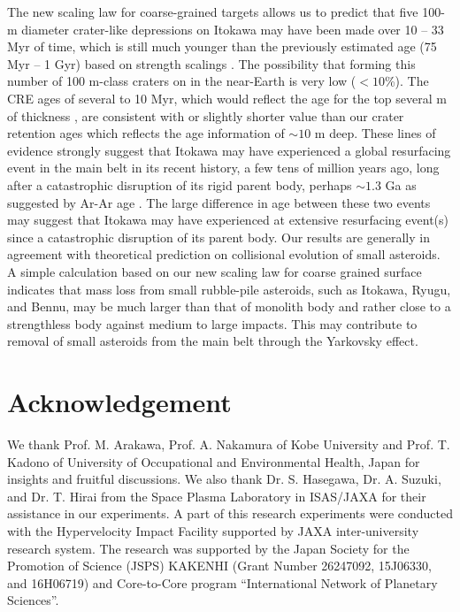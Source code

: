 \documentclass[3p,authoryear]{elsarticle}
\begin{document}
The new scaling law for coarse-grained targets allows us to predict that five 100-m diameter crater-like depressions on Itokawa may have been made over 10 -- 33 Myr of time, which is still much younger than the previously estimated age (75 Myr -- 1 Gyr) based on strength scalings \citep{michel2009}.
The possibility that forming this number of 100 m-class craters on in the near-Earth is very low ($<10$\%).
The CRE ages of several to 10 Myr, which would reflect the age for the top several m of thickness \citep{nagao2011, meier2014, nishiizumi2015}, are consistent with or slightly shorter value than  our crater retention ages which reflects the age information of $\sim 10$ m deep.
These lines of evidence strongly suggest that Itokawa may have experienced a global resurfacing event in the main belt in its recent history, a few tens of million years ago, long after a catastrophic disruption of its rigid parent body, perhaps $\sim 1.3$ Ga as suggested by Ar-Ar age \citep{park2015}.
The large difference in age between these two events may suggest that Itokawa may have experienced at extensive resurfacing event(s) since a catastrophic disruption of its parent body.
Our results are generally in agreement with theoretical prediction on collisional evolution of small asteroids.
A simple calculation based on our new scaling law for coarse grained surface indicates that mass loss from small rubble-pile asteroids, such as Itokawa, Ryugu, and Bennu, may be much larger than that of monolith body and rather close to a strengthless body against medium to large impacts.
This may contribute to removal of small asteroids from the main belt through the Yarkovsky effect.

\section*{Acknowledgement}
We thank Prof. M. Arakawa, Prof. A. Nakamura of Kobe University and Prof. T. Kadono of University of Occupational and Environmental Health, Japan for insights and fruitful discussions. We also thank Dr. S. Hasegawa, Dr. A. Suzuki, and Dr. T. Hirai from the Space Plasma Laboratory in ISAS/JAXA for their assistance in our experiments. A part of this research experiments were conducted with the Hypervelocity Impact Facility supported by JAXA inter-university research system.
The research was supported by the Japan Society for the Promotion of Science (JSPS) KAKENHI (Grant Number 26247092, 15J06330, and 16H06719) and Core-to-Core program ``International Network of Planetary Sciences''.
\end{document}

